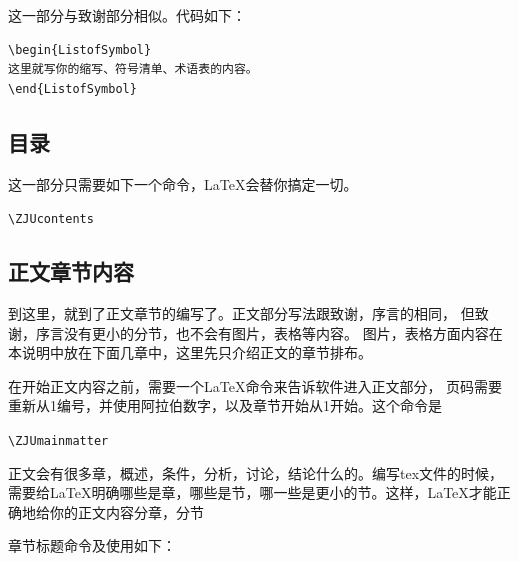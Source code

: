 这一部分与致谢部分相似。代码如下：

{
\linespread{1}
\noindent
\begin{verbatim}
\begin{ListofSymbol}
这里就写你的缩写、符号清单、术语表的内容。
\end{ListofSymbol}
\end{verbatim}
}

\subsection{目录}

这一部分只需要如下一个命令，\LaTeX 会替你搞定一切。

\verb+\ZJUcontents+

\subsection{正文章节内容}

到这里，就到了正文章节的编写了。正文部分写法跟致谢，序言的相同，
但致谢，序言没有更小的分节，也不会有图片，表格等内容。
图片，表格方面内容在本说明中放在下面几章中，这里先只介绍正文的章节排布。

在开始正文内容之前，需要一个\LaTeX 命令来告诉软件进入正文部分，
页码需要重新从1编号，并使用阿拉伯数字，以及章节开始从1开始。这个命令是

\verb+\ZJUmainmatter+

正文会有很多章，概述，条件，分析，讨论，结论什么的。编写tex文件的时候，
需要给\LaTeX 明确哪些是章，哪些是节，哪一些是更小的节。这样，\LaTeX 才能正确地给你的正文内容分章，分节

章节标题命令及使用如下：

